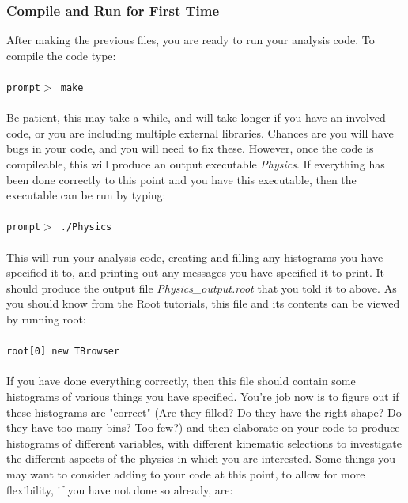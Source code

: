 \documentclass[12pt]{article}
\begin{document}
\subsubsection{Compile and Run for First Time} 
After making the previous files, you are ready to run your analysis code.  To compile the code type:\\
\\
\texttt{prompt$>$ make}\\
\\
Be patient, this may take a while, and will take longer if you have an involved code, or you are including multiple external libraries.  Chances are you will have bugs in your code, and you will need to fix these.  However, once the code is compileable, this will produce an output executable \textit{Physics}.  If everything has been done correctly to this point and you have this executable, then the executable can be run by typing: \\ 
\\
\texttt{prompt$>$ ./Physics}\\ 
\\
This will run your analysis code, creating and filling any histograms you have specified it to, and printing out any messages you have specified it to print.  It should produce the output file \textit{Physics\_output.root} that you told it to above.  As you should know from the Root tutorials, this file and its contents can be viewed by running root:\\ 
\\
\texttt{root[0] new TBrowser}\\ 
\\
If you have done everything correctly, then this file should contain some histograms of various things you have specified.  You're job now is to figure out if these histograms are "correct" (Are they filled? Do they have the right shape?  Do they have too many bins? Too few?) and then elaborate on your code to produce histograms of different variables, with different kinematic selections to investigate the different aspects of the physics in which you are interested.  Some things you may want to consider adding to your code at this point, to allow for more flexibility, if you have not done so already, are:
\end{document}
